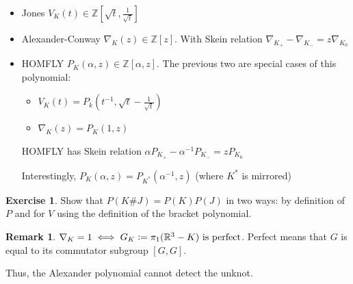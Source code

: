 \documentclass[11pt]{article}
\newcommand{\Z}{\mathbb{Z}}
\newcommand{\R}{\mathbb{R}}
\newcommand{\defeq}{\vcentcolon=}
\theoremstyle{plain}
\theoremstyle{definition}
\newtheorem{remark}{Remark}
\newtheorem{exercise}{Exercise}
\begin{document}
\begin{itemize}
  \item Jones $V_K(t) \in \Z[\sqrt{t}, \frac{1}{\sqrt{t}}]$
  \item Alexander-Conway $\nabla_K(z) \in \Z[z]$. With Skein relation $\nabla_{K_+} - \nabla_{K_-} = z \nabla_{K_0}$
  \item HOMFLY $P_K(\alpha, z) \in \Z[\alpha, z]$. The previous two are special cases of this polynomial:

    \begin{itemize}
      \item $V_K(t) = P_k(t^{-1}, \sqrt{t} - \frac{1}{\sqrt{t}})$
      \item $\nabla_K(z) = P_K(1, z)$
    \end{itemize}

    HOMFLY has Skein relation $\alpha P_{K_+} - \alpha^{-1} P_{K_-} = z P_{K_0}$

    Interestingly, $P_K(\alpha, z) = P_{K^\ast}(\alpha^{-1}, z)$ (where $K^\ast$ is mirrored)
\end{itemize}



\begin{exercise}
  Show that $P(K \# J) = P(K) P(J)$ in two ways: by definition of $P$ and for $V$ using the definition of the bracket polynomial.
\end{exercise}


\begin{remark}
  $\nabla_K = 1 \iff G_K \defeq \pi_1(\R^3 - K) \text{ is perfect}$. Perfect means that $G$ is equal to its commutator subgroup $[G,G]$.

 Thus, the Alexander polynomial cannot detect the unknot.
\end{remark}
\end{document}
